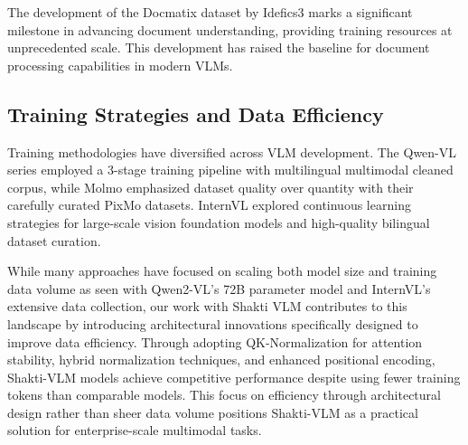 The development of the Docmatix dataset by Idefics3\cite{laurençon2024buildingbetterunderstandingvisionlanguage} marks a significant milestone in advancing document understanding, providing training resources at unprecedented scale. This development has raised the baseline for document processing capabilities in modern VLMs.  

\subsection{Training Strategies and Data Efficiency}
Training methodologies have diversified across VLM development. The Qwen-VL\cite{bai2023qwenvlversatilevisionlanguagemodel} series employed a 3-stage training pipeline with multilingual multimodal cleaned corpus, while Molmo\cite{deitke2024molmopixmoopenweights} emphasized dataset quality over quantity with their carefully curated PixMo datasets. InternVL explored continuous learning strategies for large-scale vision foundation models and high-quality bilingual dataset curation. 

While many approaches have focused on scaling both model size and training data volume as seen with Qwen2-VL's 72B parameter model and InternVL's extensive data collection, our work with Shakti VLM contributes to this landscape by introducing architectural innovations specifically designed to improve data efficiency. Through adopting QK-Normalization\cite{henry2020querykeynormalizationtransformers} for attention stability, hybrid normalization techniques, and enhanced positional encoding, Shakti-VLM models achieve competitive performance despite using fewer training tokens than comparable models. This focus on efficiency through architectural design rather than sheer data volume positions Shakti-VLM as a practical solution for enterprise-scale multimodal tasks.